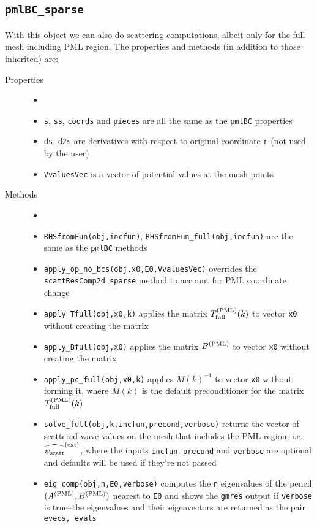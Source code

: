 \subsection{{\tt pmlBC\_sparse}}
\label{sec-pmlBC_sparse}

With this object we can also do scattering
computations, albeit only for the
full mesh including PML region. 
The properties and methods (in addition to those inherited) are:
\begin{description}
 \item[Properties]
   \begin{itemize}
    \item[]
    \item {\tt s}, {\tt ss}, {\tt coords}
          and {\tt pieces} are
          all the same as the {\tt pmlBC} properties
    \item {\tt ds}, {\tt d2s} are derivatives with respect
          to original coordinate {\tt r} (not used by the user)
    \item {\tt VvaluesVec} is a vector of potential values
          at the mesh points
   \end{itemize}
 \item[Methods]
   \begin{itemize}
    \item[]
    \item {\tt RHSfromFun(obj,incfun)}, 
          {\tt RHSfromFun\_full(obj,incfun)}
          are the same as the {\tt pmlBC} methods
    \item {\tt apply\_op\_no\_bcs(obj,x0,E0,VvaluesVec)}
          overrides the {\tt scattResComp2d\_sparse} method
          to account for PML coordinate change
    \item {\tt apply\_Tfull(obj,x0,k)} applies the
          matrix $T^{(\text{PML})}_{\text{full}}(k)$ to vector {\tt x0}
          without creating the matrix
    \item {\tt apply\_Bfull(obj,x0)} applies the
          matrix $B^{(\text{PML})}$ to vector {\tt x0}
          without creating the matrix
    \item {\tt apply\_pc\_full(obj,x0,k)} applies
          $M(k)^{-1}$ to vector {\tt x0} without forming it,
          where $M(k)$ is the default preconditioner for
          the matrix $T^{(\text{PML})}_{\text{full}}(k)$
    \item {\tt solve\_full(obj,k,incfun,precond,verbose)}
          returns the vector of scattered wave values on the 
          mesh that includes the PML region,
          i.e. $\widehat{\psi_{\text{scatt}}}^{(\text{ext})}$,
          where the inputs {\tt incfun}, {\tt precond} and
          {\tt verbose} are optional and defaults will be used
          if they're not passed
    \item {\tt eig\_comp(obj,n,E0,verbose)} computes the {\tt n} eigenvalues
          of the pencil $(A^{(\text{PML})},B^{(\text{PML})})$ nearest to {\tt E0} and shows the {\tt gmres}
          output if {\tt verbose} is true--the eigenvalues and their eigenvectors
          are returned as the pair {\tt evecs, evals}
   \end{itemize}
\end{description}
